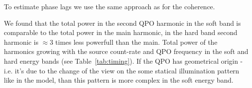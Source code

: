 To estimate phase lags we use the same approach as for the coherence.



We found that the total power in the second QPO harmonic in the soft band is comparable to the total power in the main harmonic, in the hard band second harmonic is $\approx3$ times less powerfull than the main. 
Total power of the harmonics growing with the source count-rate and QPO frequency in the soft and hard energy bands (see Table~\ref{tab:timing}). 
If the QPO has geometrical origin - i.e. it's due to the change of the view on the some statical illumination pattern like in the \citep{IVK09} model, than this pattern is more complex in the soft energy band. 


